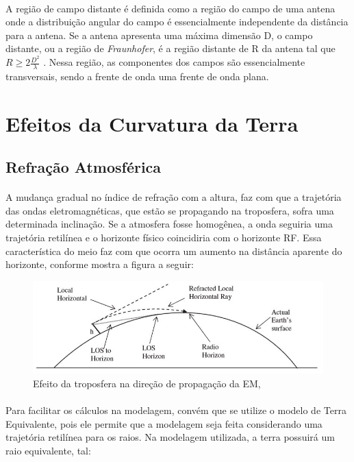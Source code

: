 \paragraph{}A região de campo distante é definida como a região do campo de uma antena onde a distribuição angular do campo é essencialmente independente da distância para a antena. Se a antena apresenta uma máxima dimensão D, o campo distante, ou a região de \textit{Fraunhofer}, é a região distante de R da antena tal que $R \geq 2\frac{D^2}{\lambda}$ \citep{balanis}. Nessa região, as componentes dos campos são essencialmente transversais, sendo a frente de onda uma frente de onda plana.

\section{Efeitos da Curvatura da Terra}

\subsection{Refração Atmosférica}

\paragraph{}A mudança gradual no índice de refração com a altura, faz com que a trajetória das ondas eletromagnéticas, que estão se propagando na troposfera, sofra uma determinada inclinação. Se a atmosfera fosse homogênea, a onda seguiria uma trajetória retilínea e o horizonte físico coincidiria com o horizonte RF. Essa característica do meio faz com que ocorra um aumento na distância aparente do horizonte, conforme mostra a figura a seguir:

\FloatBarrier
\begin{figure}[!htp]
\centering
\includegraphics[scale = 0.5]{Figuras/refracao.JPG}
\caption{Efeito da troposfera na direção de propagação da EM, \citep{seybold}}
\end{figure}
\FloatBarrier

\paragraph{}Para facilitar os cálculos na modelagem, convém que se utilize o modelo de Terra Equivalente, pois ele permite que a modelagem seja feita considerando uma trajetória retilínea para os raios. Na modelagem utilizada, a terra possuirá um raio equivalente, tal:

